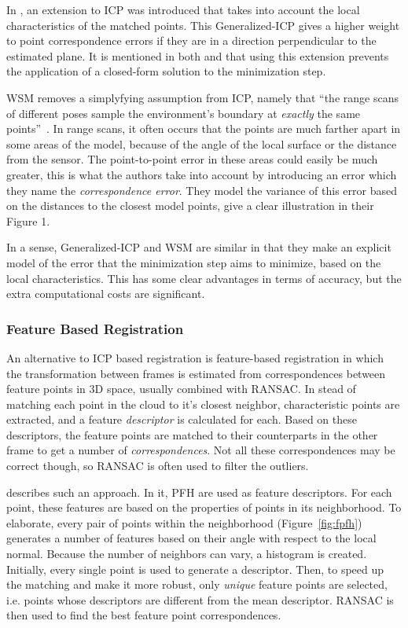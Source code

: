 \documentclass[a4paper]{article}
\begin{document}
In \cite{segal2009generalized}, an extension to \ac{ICP} was introduced that takes into account the local characteristics of the matched points. This Generalized-ICP gives a higher weight to point correspondence errors if they are in a direction perpendicular to the estimated plane. It is mentioned in both \cite{rusinkiewicz2001efficient} and \cite{segal2009generalized} that using this extension prevents the application of a closed-form solution to the minimization step.

\ac{WSM} removes a simplyfying assumption from \ac{ICP}, namely that ``the range scans of different poses sample the environment's boundary at \emph{exactly} the same points''~\cite{pfister2002weighted}. In range scans, it often occurs that the points are much farther apart in some areas of the model, because of the angle of the local surface or the distance from the sensor. The point-to-point error in these areas could easily be much greater, this is what the authors take into account by introducing an error which they name the \emph{correspondence error}. They model the variance of this error based on the distances to the closest model points, \cite{slamet2008boosting} give a clear illustration in their Figure 1. 

In a sense, Generalized-ICP and \ac{WSM} are similar in that they make an explicit model of the error that the minimization step aims to minimize, based on the local characteristics. This has some clear advantages in terms of accuracy, but the extra computational costs are significant.

\subsubsection{Feature Based Registration}

An alternative to \ac{ICP} based registration is feature-based registration in which the transformation between frames is estimated from correspondences between feature points in 3D space, usually combined with \ac{RANSAC}. In stead of matching each point in the cloud to it's closest neighbor, characteristic points are extracted, and a feature \emph{descriptor} is calculated for each. Based on these descriptors, the feature points are matched to their counterparts in the other frame to get a number of \emph{correspondences}. Not all these correspondences may be correct though, so \ac{RANSAC} is often used to filter the outliers. 

\cite{rusu2009fast} describes such an approach. In it, \ac{PFH} are used as feature descriptors. For each point, these features are based on the properties of points in its neighborhood. To elaborate, every pair of points within the neighborhood (Figure~\ref{fig:fpfh}) generates a number of features based on their angle with respect to the local normal. Because the number of neighbors can vary, a histogram is created. Initially, every single point is used to generate a descriptor. Then, to speed up the matching and make it more robust, only \emph{unique} feature points are selected, i.e. points whose descriptors are different from the mean descriptor. \ac{RANSAC} is then used to find the best feature point correspondences.  
\end{document}
